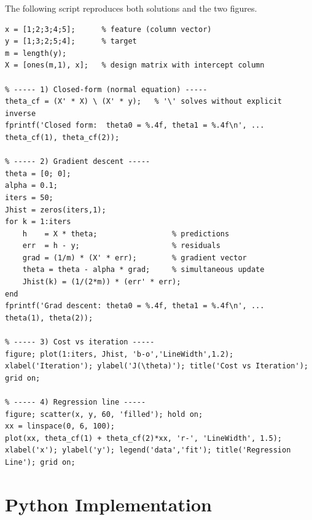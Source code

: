 \documentclass[11pt,a4paper]{report}
\theoremstyle{definition}
\theoremstyle{plain}
\theoremstyle{remark}
\begin{document}
	The following script reproduces both solutions and the two figures.
	
	\begin{lstlisting}[style=matlab,caption={Linear regression in MATLAB.}]
% ----- Data -----
x = [1;2;3;4;5];      % feature (column vector)
y = [1;3;2;5;4];      % target
m = length(y);
X = [ones(m,1), x];   % design matrix with intercept column

% ----- 1) Closed-form (normal equation) -----
theta_cf = (X' * X) \ (X' * y);   % '\' solves without explicit inverse
fprintf('Closed form:  theta0 = %.4f, theta1 = %.4f\n', ...
theta_cf(1), theta_cf(2));

% ----- 2) Gradient descent -----
theta = [0; 0];
alpha = 0.1;
iters = 50;
Jhist = zeros(iters,1);
for k = 1:iters
	h    = X * theta;                 % predictions
	err  = h - y;                     % residuals
	grad = (1/m) * (X' * err);        % gradient vector
	theta = theta - alpha * grad;     % simultaneous update
	Jhist(k) = (1/(2*m)) * (err' * err);
end
fprintf('Grad descent: theta0 = %.4f, theta1 = %.4f\n', ...
theta(1), theta(2));

% ----- 3) Cost vs iteration -----
figure; plot(1:iters, Jhist, 'b-o','LineWidth',1.2);
xlabel('Iteration'); ylabel('J(\theta)'); title('Cost vs Iteration'); grid on;

% ----- 4) Regression line -----
figure; scatter(x, y, 60, 'filled'); hold on;
xx = linspace(0, 6, 100);
plot(xx, theta_cf(1) + theta_cf(2)*xx, 'r-', 'LineWidth', 1.5);
xlabel('x'); ylabel('y'); legend('data','fit'); title('Regression Line'); grid on;
	\end{lstlisting}
	
	\chapter{Python Implementation}
	
\end{document}
